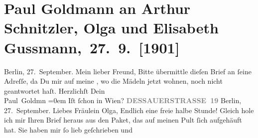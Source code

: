                \section[Paul Goldmann an Arthur Schnitzler, Olga und Elisabeth Gussmann, 27. 9. {[}1901{]}]{ Paul Goldmann an Arthur Schnitzler, Olga und Elisabeth
               Gussmann, 27. 9. {[}1901{]}}\nopagebreak{}\rehead{ }\begin{ledgroupsized}[t]{13cm}\normalsize\beginnumbering \toendnotes[C]{\smallbreak\pagebreak[2]} 
\toendnotes[C]{\smallbreak}{\bigskip}\pstart
           \centering{}{\pb}Berlin, 27. September.\pend
           \pstart{}Mein lieber Freund,\pend\pstart
           Bitte übermittle dieſen Brief an ſeine Adreſſe, da Du mir auf meine \label{K_L03086-3v}\label{K_L03086-3h}, wo die Mädeln jetzt wohnen, noch nicht geantwortet haſt.\pend
           \pstart
           Herzlichſt Dein {\\[\baselineskip]}\spacefill\mbox{Paul Goldmn}\pend
           \leftskip=0em{}\pstart
           \noindent{}Iſt \label{K_L03086-2v}\label{K_L03086-2h} ſchon in Wien?
               \pend
           \pstart
           \noindent{}\raggedleft{}{\pb}\textcolor{gray}{\textbf{DESSAUERSTRASSE 19}}\pend
           \pstart
           \centering{}Berlin, 27. September.\pend
           \pstart\center{}Liebes Fräulein Olga,\pend\pstart
           Endlich eine freie halbe Stunde! Gleich hole ich mir Ihren Brief heraus aus den
               Paket, das auf meinen Pult ſich aufgehäuft hat. Sie haben mir ſo lieb geſchrieben und

\end{ledgroupsized}
